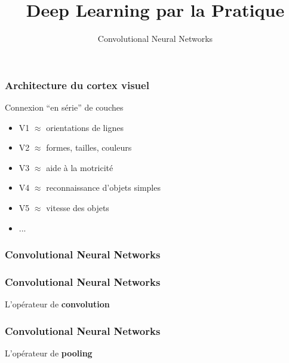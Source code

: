 \documentclass{formation}
\title{Deep Learning par la Pratique}
\subtitle{Convolutional Neural Networks}
\begin{document}
\maketitle

\begin{frame}
  \frametitle{Architecture du cortex visuel}
  \begin{minipage}[l]{0.55\linewidth}
  \end{minipage}\hfill
  \begin{minipage}[l]{0.44\linewidth}
    Connexion ``en série'' de couches
    \begin{itemize}
    \item V1 $\approx$ orientations de lignes
    \item V2 $\approx$ formes, tailles, couleurs
    \item V3 $\approx$ aide à la motricité
    \item V4 $\approx$ reconnaissance d'objets simples
    \item V5 $\approx$ vitesse des objets
    \item ...
    \end{itemize}
  \end{minipage}\hfill
\end{frame}

\begin{frame}
  \frametitle{Convolutional Neural Networks}
\end{frame}

\begin{frame}
  \frametitle{Convolutional Neural Networks}
  L'opérateur de \textbf{convolution}
\end{frame}

\begin{frame}
  \frametitle{Convolutional Neural Networks}
  L'opérateur de \textbf{pooling}
\end{frame}
\end{document}
